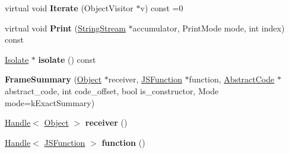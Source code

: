 \begin{DoxyCompactItemize}
\item 
virtual void {\bfseries Iterate} (Object\+Visitor $\ast$v) const  =0\hypertarget{classv8_1_1internal_1_1_b_a_s_e___e_m_b_e_d_d_e_d_aabb99db6365057fd06299472b393565c}{}\label{classv8_1_1internal_1_1_b_a_s_e___e_m_b_e_d_d_e_d_aabb99db6365057fd06299472b393565c}

\item 
virtual void {\bfseries Print} (\hyperlink{classv8_1_1internal_1_1_string_stream}{String\+Stream} $\ast$accumulator, Print\+Mode mode, int index) const \hypertarget{classv8_1_1internal_1_1_b_a_s_e___e_m_b_e_d_d_e_d_a43be1fc8e032e957bf4ed56c98ac2c14}{}\label{classv8_1_1internal_1_1_b_a_s_e___e_m_b_e_d_d_e_d_a43be1fc8e032e957bf4ed56c98ac2c14}

\item 
\hyperlink{classv8_1_1internal_1_1_isolate}{Isolate} $\ast$ {\bfseries isolate} () const \hypertarget{classv8_1_1internal_1_1_b_a_s_e___e_m_b_e_d_d_e_d_a8fd23ecb465f23cd3c60deb9a7bde1f8}{}\label{classv8_1_1internal_1_1_b_a_s_e___e_m_b_e_d_d_e_d_a8fd23ecb465f23cd3c60deb9a7bde1f8}

\item 
{\bfseries Frame\+Summary} (\hyperlink{classv8_1_1internal_1_1_object}{Object} $\ast$receiver, \hyperlink{classv8_1_1internal_1_1_j_s_function}{J\+S\+Function} $\ast$function, \hyperlink{classv8_1_1internal_1_1_abstract_code}{Abstract\+Code} $\ast$abstract\+\_\+code, int code\+\_\+offset, bool is\+\_\+constructor, Mode mode=k\+Exact\+Summary)\hypertarget{classv8_1_1internal_1_1_b_a_s_e___e_m_b_e_d_d_e_d_aa770c5e0eae82eb677971fea7d153a56}{}\label{classv8_1_1internal_1_1_b_a_s_e___e_m_b_e_d_d_e_d_aa770c5e0eae82eb677971fea7d153a56}

\item 
\hyperlink{classv8_1_1internal_1_1_handle}{Handle}$<$ \hyperlink{classv8_1_1internal_1_1_object}{Object} $>$ {\bfseries receiver} ()\hypertarget{classv8_1_1internal_1_1_b_a_s_e___e_m_b_e_d_d_e_d_ac5c021e4c412a7d6dbbc961c0a426dfb}{}\label{classv8_1_1internal_1_1_b_a_s_e___e_m_b_e_d_d_e_d_ac5c021e4c412a7d6dbbc961c0a426dfb}

\item 
\hyperlink{classv8_1_1internal_1_1_handle}{Handle}$<$ \hyperlink{classv8_1_1internal_1_1_j_s_function}{J\+S\+Function} $>$ {\bfseries function} ()\hypertarget{classv8_1_1internal_1_1_b_a_s_e___e_m_b_e_d_d_e_d_aba2aa67ae4e9d150eb5290d1c258d53d}{}\label{classv8_1_1internal_1_1_b_a_s_e___e_m_b_e_d_d_e_d_aba2aa67ae4e9d150eb5290d1c258d53d}


\end{DoxyCompactItemize}
